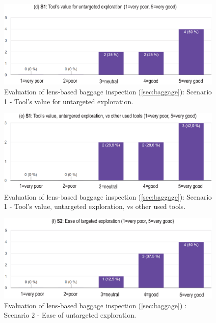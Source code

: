\begin{figure}
\centering
\includegraphics [width=\textwidth]{images/graph4.eps}
\caption{Evaluation of lens-based baggage inspection (\autoref{sec:baggage}): Scenario 1 - Tool's value for untargeted exploration.}
\label{fig:graph4}
\end{figure}

\begin{figure}
\centering
\includegraphics [width=\textwidth]{images/graph5.eps}
\caption{Evaluation of lens-based baggage inspection (\autoref{sec:baggage}): Scenario 1 - Tool's value, untargeted exploration, vs other used tools.}
\label{fig:graph5}
\end{figure}

\begin{figure}
\centering
\includegraphics [width=\textwidth]{images/graph6.eps}
\caption{Evaluation of lens-based baggage inspection (\autoref{sec:baggage}) : Scenario 2 - Ease of untargeted exploration.}
\label{fig:graph6}
\end{figure}

